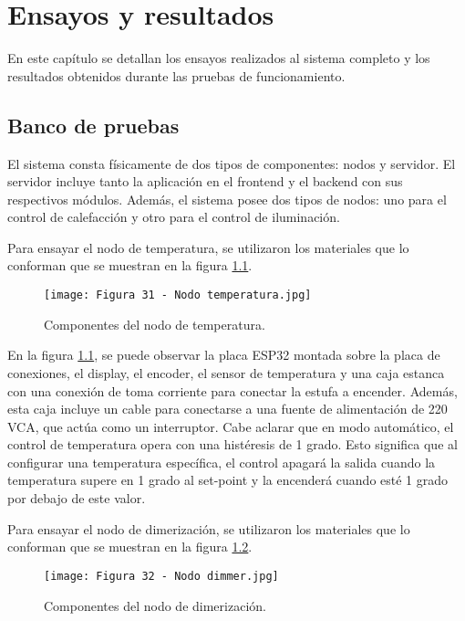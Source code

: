 \chapter{Ensayos y resultados}

\label{Chapter4}

En este capítulo se detallan los ensayos realizados al sistema completo y los resultados obtenidos durante las pruebas de funcionamiento.

\section{Banco de pruebas}

El sistema consta físicamente de dos tipos de componentes: nodos y servidor. El servidor incluye tanto la aplicación en el frontend y el backend con sus respectivos módulos. Además, el sistema posee dos tipos de nodos: uno para el control de calefacción y otro para el control de iluminación.

Para ensayar el nodo de temperatura, se utilizaron los materiales que lo conforman que se muestran en la figura \ref{fig:31}.

\begin{figure}[h]
\centering
\texttt{[image: Figura 31 - Nodo temperatura.jpg]}
\caption[Componentes del nodo de temperatura]{Componentes del nodo de temperatura.}
\label{fig:31}
\end{figure}

En la figura \ref{fig:31}, se puede observar la placa ESP32 montada sobre la placa de conexiones, el display, el encoder, el sensor de temperatura y una caja estanca con una conexión de toma corriente para conectar la estufa a encender. Además, esta caja incluye un cable para conectarse a una fuente de alimentación de 220 VCA, que actúa como un interruptor. Cabe aclarar que en modo automático, el control de temperatura opera con una histéresis de 1 grado. Esto significa que al configurar una temperatura específica, el control apagará la salida cuando la temperatura supere en 1 grado al set-point y la encenderá cuando esté 1 grado por debajo de este valor.

Para ensayar el nodo de dimerización, se utilizaron los materiales que lo conforman que se muestran en la figura \ref{fig:32}.

\begin{figure}[h]
\centering
\texttt{[image: Figura 32 - Nodo dimmer.jpg]}
\caption[Componentes del nodo de dimerización]{Componentes del nodo de dimerización.}
\label{fig:32}
\end{figure}

